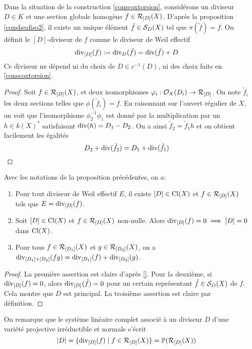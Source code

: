 \begin{cons}\label{conscoxtorsionDDiviseur}
Dans la situation de la construction \ref{conscoxtorsion}, considérons un diviseur $D\in K$ et une section globale homogène $f\in\mathcal{R}_{[D]}(X)$. D'après la proposition \ref{coxsheafiso2}, il existe un unique élément $\tilde{f}\in\mathcal{S}_D(X)$ tel que $\pi(\tilde{f})=f$. On définit le $[D]$-diviseur de $f$ comme le diviseur de Weil effectif
$$\operatorname{div}_{[D]}(f):=\operatorname{div}_D(\tilde{f})=\operatorname{div}(\tilde{f})+D$$
Ce diviseur ne dépend ni du choix de $D\in c^{-1}(D)$, ni des choix faits en \ref{conscoxtorsion}.
\end{cons}
\begin{proof}
Soit $f\in\mathcal{R}_{[D]}(X)$, et deux isomorphismes $\varphi_i:\mathcal{O}_X(D_i)\rightarrow \mathcal{R}_{[D]}$. On note $\tilde{f}_i$ les deux sections telles que $\phi(\tilde{f}_i)=f$. En raisonnant sur l'ouvert régulier de $X$, on voit que l'isomorphisme $\phi_2^{-1}\phi_1$ est donné par la multiplication par un $h\in k(X)^*$ satisfaisant $\operatorname{div}(h)=D_1-D_2$. On a ainsi $\tilde{f}_2=\tilde{f}_1h$ et on obtient facilement les égalités
$$D_2+\operatorname{div}(\tilde{f}_2)=D_1+\operatorname{div}(\tilde{f}_1)$$
\end{proof}


\begin{prop}\label{diviCoxTorsFormulas}
Avec les notations de la proposition précédentes, on a:
\begin{enumerate}
\item Pour tout diviseur de Weil effectif $E$, il existe $[D]\in\operatorname{Cl}(X)$ et $f\in\mathcal{R}_{[D]}(X)$ tels que $E=\operatorname{div}_{[D]}(f)$.
\item Soit $[D]\in\operatorname{Cl}(X)$ et $f\in\mathcal{R}_{[D]}(X)$ non-nulle. Alors $\operatorname{div}_{[D]}(f)=0\implies [D]=0$ dans $\operatorname{Cl}(X)$.
\item Pour tous $f\in\mathcal{R}_{[D_1]}(X)$ et $g\in\mathcal{R}_{[D_2]}(X)$, on a $\operatorname{div}_{[D_1]+[D_2]}(fg)=\operatorname{div}_{[D_1]}(f)+\operatorname{div}_{[D_2]}(g)$.
\end{enumerate}
\end{prop}
\begin{proof}
La première assertion est claire d'après \ref{}. Pour la deuxième, si $\operatorname{div}_{[D]}(f)=0$, alors $\operatorname{div}_{[D]}(\tilde{f})=0$ pour un certain représentant $\tilde{f}\in\mathcal{S}_D(X)$ de $f$. Cela montre que $D$ est principal. La troisième assertion est claire par définition.
\end{proof}

On remarque que le système linéaire complet associé à un diviseur $D$ d'une variété projective irréductible et normale s'écrit
$$|D|=\lbrace\operatorname{div}_{[D]}(f)\mid f\in \mathcal{R}_{[D]}(X)\rbrace = \mathbb{P}(\mathcal{R}_{[D]}(X))$$

